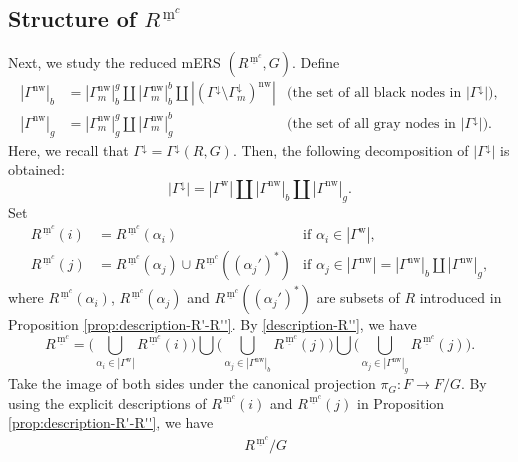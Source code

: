 \documentclass[11pt]{amsart}
\newcommand{\mc}{\, \underline{\mathrm{m}}^c}
\newcommand{\w}{\mathrm{w}}
\newcommand{\nw}{\mathrm{nw}}
\begin{document}
{\subsection{ Structure of $R^{\mc}$}\label{sect_R''} 
Next, we study the reduced mERS $(R^{\mc},G)$. Define
\[\begin{array}{lll}
|\Gamma^\nw|_b&\!\!\!\!=|\Gamma_m^\nw|_b^g\amalg 
|\Gamma_m^\nw|_b^b\amalg
|(\Gamma^\downarrow\setminus\Gamma_m^\downarrow)^\nw|&
\text{(the set of all black nodes in $|\Gamma^\downarrow|$)},\\[3pt]
|\Gamma^\nw|_g&\!\!\!\!=|\Gamma_m^\nw|_g^g\amalg 
|\Gamma^\nw_m|_g^b&
\text{(the set of all gray nodes in $|\Gamma^\downarrow|$)}.
\end{array}\]
\index[notations]{g916@$\vert\Gamma^\nw\vert_b$}
\index[notations]{g917@$\vert\Gamma^\nw\vert_g$}
Here, we recall that $\Gamma^\downarrow=
\Gamma^{\downarrow}(R,G)$.
Then, the following decomposition of $|\Gamma^\downarrow|$ is obtained:
\begin{equation}\label{decomp-Gamma}
|\Gamma^\downarrow|
=|\Gamma^\w|\amalg |\Gamma^\nw|_b\amalg |\Gamma^\nw|_g.
\end{equation}
Set
\[\begin{array}{lllll}
R^{\mc}(i)&\!\!\!\!=R^{\mc}(\alpha_i) & \text{if $\alpha_i\in|\Gamma^\w|$},\\[3pt]
R^{\mc}(j)&\!\!\!\!=R^{\mc}(\alpha_j)\cup R^{\mc}((\alpha_j')^\ast) & 
\text{if $\alpha_j\in|\Gamma^\nw|=|\Gamma^\nw|_b\amalg |\Gamma^\nw|_g$},
\end{array}\] 
where $R^{\mc}(\alpha_i)$, $R^{\mc}(\alpha_j)$ and 
$R^{\mc}((\alpha_j')^\ast)$ are subsets of $R$ introduced  in Proposition 
\ref{prop:description-R'-R''}.
By \eqref{description-R''}, we have
\begin{equation}\label{eq:description-Rmc}
R^{\mc}=\Big(\bigcup_{\alpha_i\in |\Gamma^\w|}R^{\mc}(i)\Big)\bigcup
\Big(\bigcup_{\alpha_j\in |\Gamma^\nw|_b}R^{\mc}(j)\Big)\bigcup
\Big(\bigcup_{\alpha_j\in |\Gamma^\nw|_g}R^{\mc}(j)\Big).
\end{equation}
Take the image of both sides under the canonical projection $\pi_G:F\to F/G$.
By using the explicit descriptions of $R^{\mc}(i)$ and $R^{\mc}(j)$ in Proposition
\ref{prop:description-R'-R''}, we have
\begin{equation}\label{description-R''/G}
\begin{aligned}
& R^{\mc}/G \\

\end{aligned}
\end{equation}}
\end{document}

